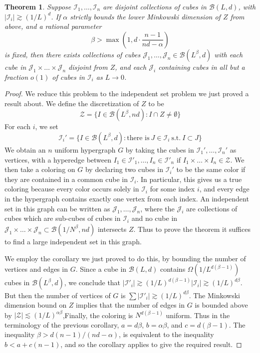 \documentclass{article}
\theoremstyle{plain}
\theoremstyle{plain}
\newtheorem{theorem}{Theorem}
\begin{document}
\begin{multicols}{2}
\begin{theorem}
	Suppose $\mathcal{I}_1, \dots, \mathcal{I}_n$ are disjoint collections of cubes in $\mathcal{B}(L,d)$, with $|\mathcal{I}_i| \gtrsim (1/L)^d$. If $\alpha$ strictly bounds the lower Minkowski dimension of $Z$ from above, and a rational parameter
	\[ \beta > \max \left(1, d \cdot \frac{n-1}{nd-\alpha} \right) \]
	is fixed, then there exists collections of cubes $\mathcal{J}_1, \dots, \mathcal{J}_n \in \mathcal{B}(L^\beta,d)$ with each cube in $\mathcal{J}_1 \times \dots \times \mathcal{J}_n$ disjoint from $Z$, and each $\mathcal{J}_i$ containing cubes in all but a fraction $o(1)$ of cubes in $\mathcal{I}_i$ as $L \to 0$.
\end{theorem}
\begin{proof}
	We reduce this problem to the independent set problem we just proved a result about. We define the discretization of $Z$ to be
	\[ \mathcal{Z} = \{ I \in \mathcal{B}(L^\beta,nd) : I \cap Z \neq \emptyset \} \]
	For each $i$, we set
	\[ \mathcal{I}_i' = \{ I \in \mathcal{B}(L^\beta,d) : \text{there is}\ J \in \mathcal{I}_i\ \text{s.t.}\ I \subset J \} \]
	We obtain an $n$ uniform hypergraph $G$ by taking the cubes in $\mathcal{I}_1', \dots, \mathcal{I}_n'$ as vertices, with a hyperedge between $I_1 \in \mathcal{I}'_1, \dots, I_n \in \mathcal{I}'_n$ if $I_1 \times \dots \times I_n \in \mathcal{Z}$. We then take a coloring on $G$ by declaring two cubes in $\mathcal{I}_i'$ to be the same color if they are contained in a common cube in $\mathcal{I}_i$. In particular, this gives us a true coloring because every color occurs solely in $\mathcal{I}_i$ for some index $i$, and every edge in the hypergraph contains exactly one vertex from each index. An independent set in this graph can be written as $\mathcal{J}_1, \dots, \mathcal{J}_n$, where the $\mathcal{J}_i$ are collections of cubes which are sub-cubes of cubes in $\mathcal{I}_i$ and no cube in $\mathcal{J}_1 \times \dots \times \mathcal{J}_n \subset \mathcal{B}(1/N^\beta,nd)$ intersects $Z$. Thus to prove the theorem it suffices to find a large independent set in this graph.

	We employ the corollary we just proved to do this, by bounding the number of vertices and edges in $G$. Since a cube in $\mathcal{B}(L,d)$ contains $\Omega(1/L^{d(\beta-1)})$ cubes in $\mathcal{B}(L^\beta,d)$, we conclude that $|\mathcal{I}'_i| \gtrsim (1/L)^{d(\beta - 1)} |\mathcal{I}_i| \gtrsim (1/L)^{d \beta}$. But then the number of vertices of $G$ is $\sum |\mathcal{I}'_i| \gtrsim (1/L)^{d \beta}$. The Minkowski dimension bound on $Z$ implies that the number of edges in $G$ is bounded above by $|\mathcal{Z}| \lesssim (1/L)^{\alpha \beta}$,Finally, the coloring is $N^{d(\beta - 1)}$ uniform. Thus in the terminology of the previous corollary, $a = d \beta$, $b = \alpha \beta$, and $c = d(\beta - 1)$. The inequality $\beta > d(n-1)/(nd - \alpha)$, is equivalent to the inequality $b < a + c(n-1)$, and so the corollary applies to give the required result.
\end{proof}


\end{multicols}
\end{document}
